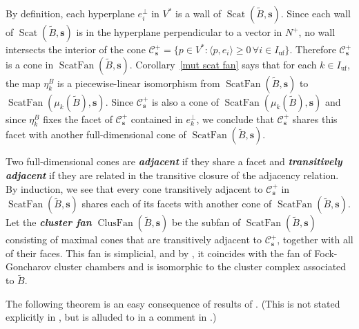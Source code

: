 \documentclass{amsart}
\theoremstyle{definition}
\theoremstyle{remark}
\numberwithin{equation}{section}
\newcommand{\newword}[1]{\textbf{\emph{#1}}}
\newcommand{\uf}{{\operatorname{uf}}}
\newcommand{\set}[1]{{\lbrace #1 \rbrace}}
\newcommand{\br}[1]{{\langle #1 \rangle}}
\newcommand{\0}{{\mathbf{0}}}
\newcommand{\s}{\mathbf{s}}
\newcommand{\tB}{\tilde{B}}
\newcommand{\C}{\mathcal{C}}
\newcommand{\Scat}{\operatorname{Scat}}
\newcommand{\ScatFan}{\operatorname{ScatFan}}
\newcommand{\ClusFan}{\operatorname{ClusFan}}
\begin{document}
By definition, each hyperplane $e_i^\perp$ in $V^*$ is a wall of $\Scat(\tB,\s)$.
Since each wall of $\Scat(\tB,\s)$ is in the hyperplane perpendicular to a vector in $N^+$, no wall intersects the interior of the cone $\C_\s^+=\set{p\in V^*:\br{p,e_i}\ge0\,\forall i\in I_\uf}$.
Therefore $\C_\s^+$ is a cone in $\ScatFan(\tB,\s)$.
Corollary~\ref{mut scat fan} says that for each $k\in I_\uf$, the map $\eta_k^B$ is a piecewise-linear isomorphism from $\ScatFan(\tB,\s)$ to $\ScatFan(\mu_k(\tB),\s)$.
Since $\C_\s^+$ is also a cone of $\ScatFan(\mu_k(\tB),\s)$ and since $\eta_k^B$ fixes the facet of $\C_\s^+$ contained in $e_k^\perp$, we conclude that $\C_\s^+$ shares this facet with another full-dimensional cone of $\ScatFan(\tB,\s)$.

Two full-dimensional cones are \newword{adjacent} if they share a facet and \newword{transitively adjacent} if they are related in the transitive closure of the adjacency relation.
By induction, we see that every cone transitively adjacent to $\C_\s^+$ in $\ScatFan(\tB,\s)$ shares each of its facets with another cone of $\ScatFan(\tB,\s)$.
Let the \newword{cluster fan} $\ClusFan(\tB,\s)$ be the subfan of $\ScatFan(\tB,\s)$ consisting of maximal cones that are transitively adjacent to $\C_\s^+$, together with all of their faces.
This fan is simplicial, and by \cite[Theorem~0.8]{GHKK}, it coincides with the fan of Fock-Goncharov cluster chambers and is isomorphic to the cluster complex associated to $\tB$.





The following theorem is an easy consequence of results of \cite{GHKK}.
(This is not stated explicitly in \cite{GHKK}, but is alluded to in a comment in \cite[Construction~4.1]{GHKK}.)
\end{document}
